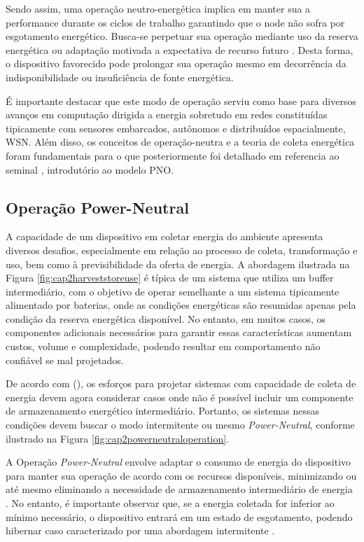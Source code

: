 Sendo assim, uma operação neutro-energética implica em manter sua a performance durante os ciclos de trabalho garantindo que o node não sofra por esgotamento energético. Busca-se perpetuar sua operação mediante uso da reserva energética ou adaptação motivada a expectativa de recurso futuro \cite{sudevalayam_energy_2011}. Desta forma, o dispositivo favorecido pode prolongar sua operação mesmo em decorrência da indisponibilidade ou insuficiência de fonte energética.

É importante destacar que este modo de operação serviu como base para diversos avanços em computação dirigida a energia sobretudo em redes constituídas tipicamente com sensores embarcados, autônomos e distribuídos espacialmente, \acf{WSN}. Além disso, os conceitos de operação-neutra e a teoria de coleta energética foram fundamentais para o que posteriormente foi detalhado em referencia ao seminal \cite{merrett_energy-driven_2017}, introdutório ao modelo \acf{PNO}.



\subsection{Operação Power-Neutral}
A capacidade de um dispositivo em coletar energia do ambiente apresenta diversos desafios, especialmente em relação ao processo de coleta, transformação e uso, bem como à previsibilidade da oferta de energia. A abordagem ilustrada na Figura \ref{fig:cap2harveststoreuse} é típica de um sistema que utiliza um buffer intermediário, com o objetivo de operar semelhante a um sistema tipicamente alimentado por baterias, onde as condições energéticas são resumidas apenas pela condição da reserva energética disponível. No entanto, em muitos casos, os componentes adicionais necessários para garantir essas características aumentam custos, volume e complexidade, podendo resultar em comportamento não confiável se mal projetados.

De acordo com \citeauthor{merrett_energy-driven_2017}(\citeyear{merrett_energy-driven_2017}), os esforços para projetar sistemas com capacidade de coleta de energia devem agora considerar casos onde não é possível incluir um componente de armazenamento energético intermediário. Portanto, os sistemas nessas condições devem buscar o modo intermitente ou mesmo \textit{Power-Neutral}, conforme ilustrado na Figura \ref{fig:cap2powerneutraloperation}.

A Operação \textit{Power-Neutral} envolve adaptar o consumo de energia do dispositivo para manter sua operação de acordo com os recursos disponíveis, minimizando ou até mesmo eliminando a necessidade de armazenamento intermediário de energia \cite{sliper_energy-driven_2020}. No entanto, é importante observar que, se a energia coletada for inferior ao mínimo necessário, o dispositivo entrará em um estado de esgotamento, podendo hibernar caso caracterizado por uma abordagem intermitente \cite{merrett_energy-driven_2017}.



